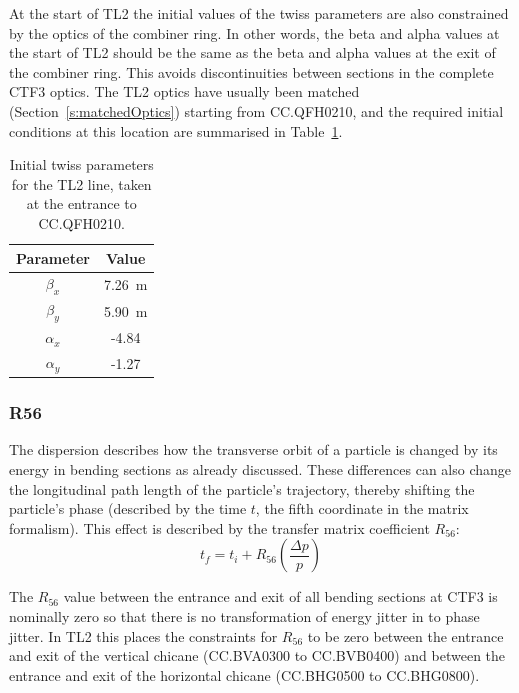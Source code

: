 At the start of TL2 the initial values of the twiss parameters are also constrained by the optics of the combiner ring. In other words, the beta and alpha values at the start of TL2 should be the same as the beta and alpha values at the exit of the combiner ring. This avoids discontinuities between sections in the complete CTF3 optics. The TL2 optics have usually been matched (Section~\ref{s:matchedOptics}) starting from CC.QFH0210, and the required initial conditions at this location are summarised in Table~\ref{t:tl2InitTwiss}.

\begin{table}
  \begin{center}
    \begin{tabular}{|c c|}
	   \hline
       Parameter & Value \\
       \hline
       \(\beta_x\) & 7.26~m\\
	   \(\beta_y\) & 5.90~m\\
	   \(\alpha_x\) & -4.84\\
	   \(\alpha_y\) & -1.27\\
	   \hline
    \end{tabular}
    \caption{Initial twiss parameters for the TL2 line, taken at the entrance to CC.QFH0210.}
  	\label{t:tl2InitTwiss}
  \end{center}
\end{table}

\subsubsection{R56}

The dispersion describes how the transverse orbit of a particle is changed by its energy in bending sections as already discussed. These differences can also change the longitudinal path length of the particle's trajectory, thereby shifting the particle's phase (described by the time \(t\), the fifth coordinate in the matrix formalism). This effect is described by the transfer matrix coefficient \(R_{56}\):
\begin{equation}
t_{f} = t_{i} + R_{56}\left(\frac{\Delta p}{p}\right)
\end{equation}

The \(R_{56}\) value between the entrance and exit of all bending sections at CTF3 is nominally zero so that there is no transformation of energy jitter in to phase jitter. In TL2 this places the constraints for \(R_{56}\) to be zero between the entrance and exit of the vertical chicane (CC.BVA0300 to CC.BVB0400) and between the entrance and exit of the horizontal chicane (CC.BHG0500 to CC.BHG0800).

